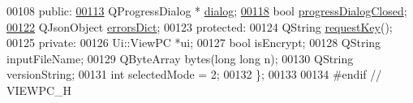 \begin{DoxyCode}
00108 \textcolor{keyword}{public}:
\hypertarget{viewpc_8h_source_l00113}{}\hyperlink{class_view_p_c_a31abbb470fe329b44e6ffee202b903ca}{00113}     QProgressDialog * \hyperlink{class_view_p_c_a31abbb470fe329b44e6ffee202b903ca}{dialog};
\hypertarget{viewpc_8h_source_l00118}{}\hyperlink{class_view_p_c_add8c82aa2b0b934212aa5bde9277ab36}{00118}     \textcolor{keywordtype}{bool} \hyperlink{class_view_p_c_add8c82aa2b0b934212aa5bde9277ab36}{progressDialogClosed};
\hypertarget{viewpc_8h_source_l00122}{}\hyperlink{class_view_p_c_a26f90436aca32e5bad46f5e69a7e7e09}{00122}     QJsonObject \hyperlink{class_view_p_c_a26f90436aca32e5bad46f5e69a7e7e09}{errorsDict};
00123 \textcolor{keyword}{protected}:
00124     QString \hyperlink{class_view_p_c_a559c95675ec98b15451f3bca47033d9c}{requestKey}();
00125 \textcolor{keyword}{private}:
00126     Ui::ViewPC *ui;
00127     \textcolor{keywordtype}{bool} isEncrypt;
00128     QString inputFileName;
00129     QByteArray bytes(\textcolor{keywordtype}{long} \textcolor{keywordtype}{long} n);
00130     QString versionString;
00131     \textcolor{keywordtype}{int} selectedMode = 2;
00132 \};
00133 
00134 \textcolor{preprocessor}{#endif // VIEWPC\_H}
\end{DoxyCode}
